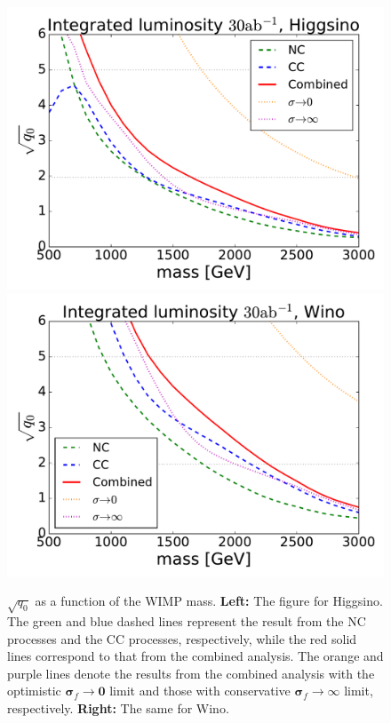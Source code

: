 \documentclass[12pt,twoside,book]{article}
\begin{document}
\begin{figure}[t]
  \centering
  \includegraphics[width=0.48\hsize]{mchi_vs_sqq0_Higgsino.pdf}
  \includegraphics[width=0.48\hsize]{mchi_vs_sqq0_Wino.pdf}
  \caption{
    $\sqrt{q_0}$ as a function of the WIMP mass.
    \textbf{Left:} The figure for Higgsino.
    The green and blue dashed lines represent the result from the NC processes and the CC processes, respectively, while the red solid lines correspond to that from the combined analysis.
    The orange and purple lines denote the results from the combined analysis with the optimistic $\bm{\sigma}_f \to \bm{0}$ limit and those with conservative $\bm{\sigma}_f \to \infty$ limit, respectively.
    \textbf{Right:} The same for Wino.
  }
  \label{fig_mchi_vs_sqq0}
\end{figure}
\end{document}
